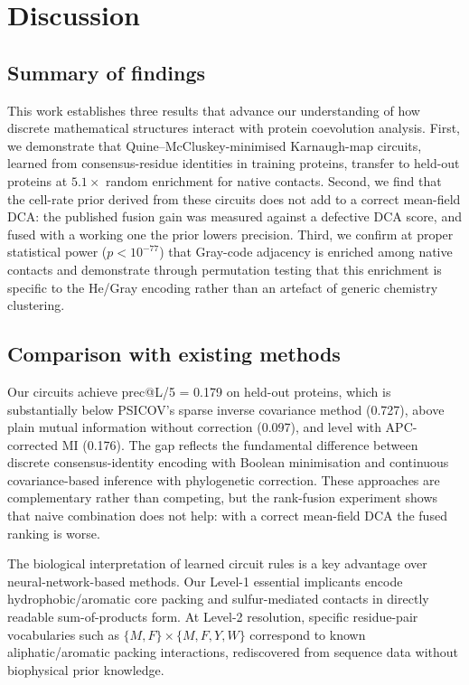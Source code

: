 \section{Discussion}
\label{sec:discussion}

\subsection{Summary of findings}
This work establishes three results that advance our understanding of how
discrete mathematical structures interact with protein coevolution analysis.
First, we demonstrate that Quine--McCluskey-minimised Karnaugh-map circuits,
learned from consensus-residue identities in training proteins, transfer to
held-out proteins at $5.1\times$ random enrichment for native contacts.
Second, we find that the cell-rate prior derived from these circuits does
not add to a correct mean-field DCA: the published fusion gain was measured
against a defective DCA score, and fused with a working one the prior lowers
precision.  Third, we confirm at proper
statistical power ($p < 10^{-77}$) that Gray-code adjacency is enriched among
native contacts and demonstrate through permutation testing that this
enrichment is specific to the He/Gray encoding rather than an artefact of
generic chemistry clustering.

\subsection{Comparison with existing methods}
Our circuits achieve prec@L/5 = 0.179 on held-out proteins, which is
substantially below PSICOV's sparse inverse covariance method (0.727), above
plain mutual information without correction (0.097), and level with
APC-corrected MI (0.176).  The gap reflects
the fundamental difference between discrete consensus-identity encoding with
Boolean minimisation and continuous covariance-based inference with
phylogenetic correction.  These approaches are complementary rather than
competing, but the rank-fusion experiment shows that naive combination does
not help: with a correct mean-field DCA the fused ranking is worse.

The biological interpretation of learned circuit rules is a key advantage
over neural-network-based methods.  Our Level-1 essential implicants encode
hydrophobic/aromatic core packing and sulfur-mediated contacts in directly
readable sum-of-products form.  At Level-2 resolution, specific residue-pair
vocabularies such as $\{M,F\}\times\{M,F,Y,W\}$ correspond to known
aliphatic/aromatic packing interactions, rediscovered from sequence data
without biophysical prior knowledge.

